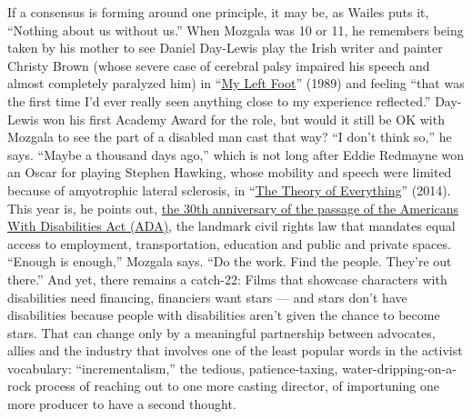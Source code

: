 If a consensus is forming around one principle, it may be, as Wailes
puts it, ``Nothing about us without us.'' When Mozgala was 10 or 11, he
remembers being taken by his mother to see Daniel Day-Lewis play the
Irish writer and painter Christy Brown (whose severe case of cerebral
palsy impaired his speech and almost completely paralyzed him) in
``\href{https://www.nytimes3xbfgragh.onion/watching/titles/my-left-foot}{My
Left Foot}'' (1989) and feeling ``that was the first time I'd ever
really seen anything close to my experience reflected.'' Day-Lewis won
his first Academy Award for the role, but would it still be OK with
Mozgala to see the part of a disabled man cast that way? ``I don't think
so,'' he says. ``Maybe a thousand days ago,'' which is not long after
Eddie Redmayne won an Oscar for playing Stephen Hawking, whose mobility
and speech were limited because of amyotrophic lateral sclerosis, in
``\href{https://www.nytimes3xbfgragh.onion/2014/11/07/movies/in-the-theory-of-everything-stephen-hawkings-home-life.html}{The
Theory of Everything}'' (2014). This year is, he points out,
\href{https://www.nytimes3xbfgragh.onion/interactive/2020/us/disability-ADA-30-anniversary.html}{the
30th anniversary of the passage of the Americans With Disabilities Act
(ADA)}, the landmark civil rights law that mandates equal access to
employment, transportation, education and public and private spaces.
``Enough is enough,'' Mozgala says. ``Do the work. Find the people.
They're out there.'' And yet, there remains a catch-22: Films that
showcase characters with disabilities need financing, financiers want
stars --- and stars don't have disabilities because people with
disabilities aren't given the chance to become stars. That can change
only by a meaningful partnership between advocates, allies and the
industry that involves one of the least popular words in the activist
vocabulary: ``incrementalism,'' the tedious, patience-taxing,
water-dripping-on-a-rock process of reaching out to one more casting
director, of importuning one more producer to have a second thought.

